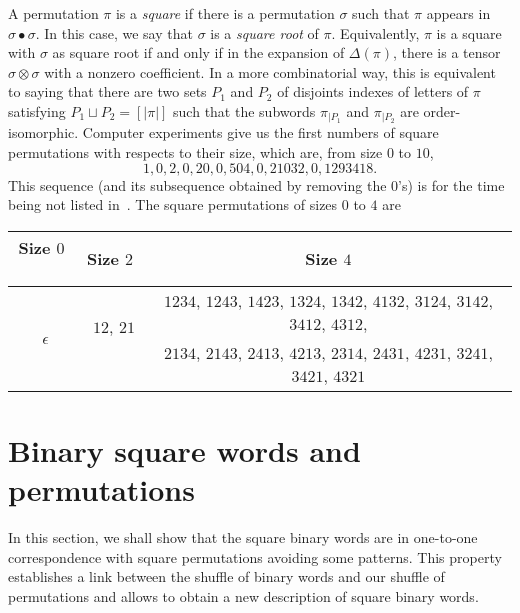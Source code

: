 \documentclass[a4paper]{llncs}
\DeclareMathOperator{\SHUFFLE}{\bullet}
\begin{document}
A permutation $\pi$ is a {\em square} if there is a permutation 
$\sigma$ such that $\pi$ appears in $\sigma \SHUFFLE \sigma$.
In this case, we say that $\sigma$ is a {\em square root} of $\pi$.
Equivalently, $\pi$ is a square with $\sigma$ as square root if and only
if in the expansion of $\Delta(\pi)$, there is a tensor
$\sigma \otimes \sigma$ with a nonzero coefficient. In a more
combinatorial way, this is equivalent to saying that there are two sets
$P_1$ and $P_2$ of disjoints indexes of letters of $\pi$ satisfying
$P_1 \sqcup P_2 = [|\pi|]$ such that the subwords $\pi_{|P_1}$ and
$\pi_{|P_2}$ are order-isomorphic. Computer experiments give us the
first numbers of square permutations with respects to their size, which
are, from size $0$ to $10$,
\begin{equation}
    1, 0, 2, 0, 20, 0, 504, 0, 21032, 0, 1293418.
\end{equation}
This sequence (and its subsequence obtained by removing the $0$'s) is for
the time being not listed in~\cite{Slo}. The square permutations of
sizes $0$ to $4$ are
\smallskip

\begin{tabular}{c|c|c}
    Size $0$ \, & Size $2$ & Size $4$ \\ \hline
    \multirow{2}{*}{\, $\epsilon$} &
    \multirow{2}{*}{\, $12$, $21$ \,} &
    $1234$, $1243$, $1423$, $1324$, $1342$, $4132$, $3124$, $3142$,
    $3412$, $4312$, \\
    & & $2134$, $2143$, $2413$, $4213$, $2314$, $2431$, $4231$, $3241$,
    $3421$, $4321$
\end{tabular}


\section{Binary square words and permutations}
\label{section:Binary square words and permutations}
In this section, we shall show that the square binary words are in
one-to-one correspondence with square permutations avoiding some
patterns. This property establishes a link between the shuffle of binary
words and our shuffle of permutations and allows to obtain a new
description of square binary words.
\end{document}
